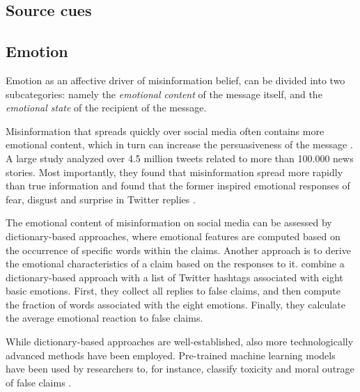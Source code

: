 \documentclass[
10pt, %
a4paper, %
oneside, %
headinclude,footinclude, %
] {book}%
\begin{document}
\cite{osmundsen2021partisan}

\subsection{Source cues}
\label{subsec:source_cues_theory}


\subsection{Emotion}
\label{subsec:emotion_theory}

Emotion as an affective driver of misinformation belief, can be divided into two subcategories: namely the \emph{emotional content} of the message itself, and the \emph{emotional state} of the recipient of the message. 


Misinformation that spreads quickly over social media often contains more emotional content, which in turn can increase the persuasiveness of the message \citep{psychological_drivers_misinformation}. A large study analyzed over 4.5 million tweets related to more than 100.000 news stories. Most importantly, they found that misinformation spread more rapidly than true information and found that the former inspired emotional responses of fear, disgust and surprise in Twitter replies \citep{vosoughi2018spread}. 

The emotional content of misinformation on social media can be assessed by dictionary-based approaches, where emotional features are computed based on the occurrence of specific words \citep{joy2021you} within the claims. Another approach is to derive the emotional characteristics of a claim based on the  responses to it. \cite{vosoughi2018spread} combine a dictionary-based approach with a list of Twitter hashtags associated with eight basic emotions. First, they collect all replies to false claims, and then compute the fraction of words associated with the eight emotions. Finally, they calculate the average emotional reaction to false claims. 

While dictionary-based approaches are well-established, also more technologically advanced methods have been employed. Pre-trained machine learning models have been used by researchers to, for instance, classify toxicity and moral outrage of false claims \citep{brady2021social, mosleh2021elites, guo2019exploiting}. 
\end{document}
